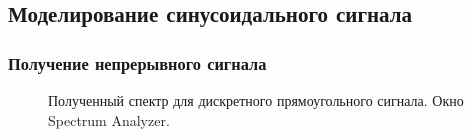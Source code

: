 \documentclass[a4paper,14pt]{extarticle}
\begin{document}
\subsection{Моделирование синусоидального сигнала}

\subsubsection{Получение непрерывного сигнала}

\begin{figure}[H]
\caption{Полученный спектр для дискретного прямоугольного 
сигнала. Окно Spectrum Analyzer.}
\label{013}
\end{figure}
\end{document}
